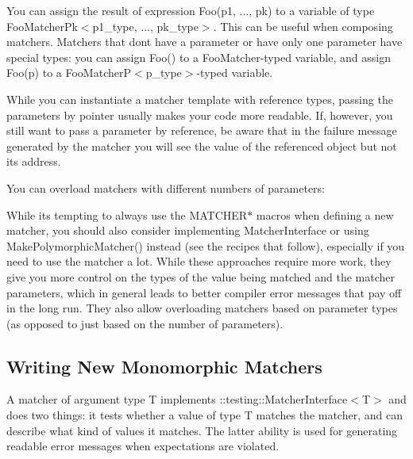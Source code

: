 You can assign the result of expression {\ttfamily Foo(p1, ..., pk)} to a variable of type {\ttfamily Foo\+Matcher\+Pk$<$p1\+\_\+type, ..., pk\+\_\+type$>$}. This can be useful when composing matchers. Matchers that don\textquotesingle{}t have a parameter or have only one parameter have special types\+: you can assign {\ttfamily Foo()} to a {\ttfamily Foo\+Matcher}-\/typed variable, and assign {\ttfamily Foo(p)} to a {\ttfamily Foo\+MatcherP$<$p\+\_\+type$>$}-\/typed variable.

While you can instantiate a matcher template with reference types, passing the parameters by pointer usually makes your code more readable. If, however, you still want to pass a parameter by reference, be aware that in the failure message generated by the matcher you will see the value of the referenced object but not its address.

You can overload matchers with different numbers of parameters\+: 
\begin{DoxyCode}{0}
\end{DoxyCode}


While it\textquotesingle{}s tempting to always use the {\ttfamily M\+A\+T\+C\+H\+E\+R$\ast$} macros when defining a new matcher, you should also consider implementing {\ttfamily Matcher\+Interface} or using {\ttfamily Make\+Polymorphic\+Matcher()} instead (see the recipes that follow), especially if you need to use the matcher a lot. While these approaches require more work, they give you more control on the types of the value being matched and the matcher parameters, which in general leads to better compiler error messages that pay off in the long run. They also allow overloading matchers based on parameter types (as opposed to just based on the number of parameters).

\subsection*{Writing New Monomorphic Matchers}

A matcher of argument type {\ttfamily T} implements {\ttfamily \+::testing\+::\+Matcher\+Interface$<$T$>$} and does two things\+: it tests whether a value of type {\ttfamily T} matches the matcher, and can describe what kind of values it matches. The latter ability is used for generating readable error messages when expectations are violated.

